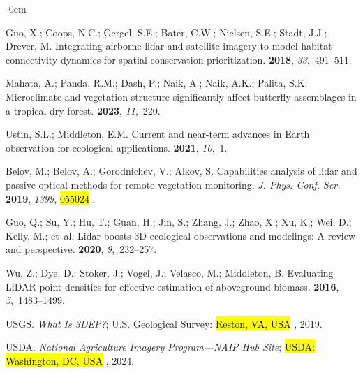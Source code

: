 \documentclass[remotesensing,article,accept,pdftex,moreauthors]{Definitions/mdpi}
\begin{document}
\begin{adjustwidth}{-\extralength}{0cm}
\begin{thebibliography}{999}
Guo, X.; Coops, N.C.; Gergel, S.E.; Bater, C.W.; Nielsen, S.E.; Stadt, J.J.;
  Drever, M.
\newblock Integrating airborne lidar and satellite imagery to model habitat
  connectivity dynamics for spatial conservation prioritization.
 {\bf 2018}, {\em 33},~491--511.

Mahata, A.; Panda, R.M.; Dash, P.; Naik, A.; Naik, A.K.; Palita, S.K.
\newblock Microclimate and vegetation structure significantly affect butterfly
  assemblages in a tropical dry forest.
 {\bf 2023}, {\em 11},~220.

Ustin, S.L.; Middleton, E.M.
\newblock Current and near-term advances in Earth observation for ecological
  applications.
 {\bf 2021}, {\em 10},~1.

Belov, M.; Belov, A.; Gorodnichev, V.; Alkov, S.
\newblock Capabilities analysis of lidar and passive optical methods for remote
  vegetation monitoring.
\newblock \emph{J. Phys. Conf. Ser.} \textbf{2019}, \emph{1399}, \hl{055024}%
.

Guo, Q.; Su, Y.; Hu, T.; Guan, H.; Jin, S.; Zhang, J.; Zhao, X.; Xu, K.; Wei,
  D.; Kelly, M.;  et~al.
\newblock Lidar boosts 3D ecological observations and modelings: A review and
  perspective.
 {\bf 2020}, {\em
  9},~232--257.

Wu, Z.; Dye, D.; Stoker, J.; Vogel, J.; Velasco, M.; Middleton, B.
\newblock Evaluating LiDAR point densities for effective estimation of
  aboveground biomass.
 {\bf
  2016}, {\em 5},~1483--1499.

USGS.
\newblock \emph{What Is {3DEP}?}; U.S. Geological Survey: \hl{Reston, VA, USA}%
, 2019.

USDA.
\newblock \emph{National Agriculture Imagery Program---NAIP Hub Site}; \hl{USDA: Washington, DC, USA}%
, 2024.


\end{thebibliography}
\end{adjustwidth}
\end{document}
